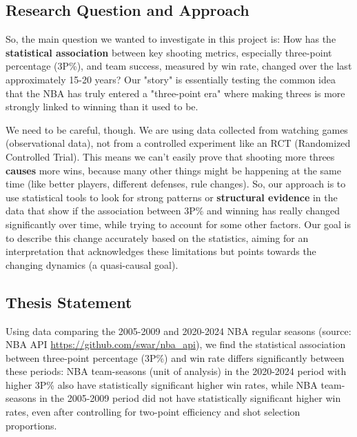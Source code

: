 \documentclass[11pt, a4paper]{article} %
\begin{document}
\subsection{Research Question and Approach} %

So, the main question we wanted to investigate in this project is: How has the \textbf{statistical association} between key shooting 
metrics, especially three-point percentage (3P\%), and team success, measured by win rate, changed over the last approximately 
15-20 years? Our "story" is essentially testing the common idea that the NBA has truly entered a "three-point era" where making 
threes is more strongly linked to winning than it used to be.

We need to be careful, though. We are using data collected from watching games (observational data), not from a controlled 
experiment like an RCT (Randomized Controlled Trial). This means we can't easily prove that shooting more threes \textbf{causes} more 
wins, because many other things might be happening at the same time (like better players, different defenses, rule changes). So, 
our approach is to use statistical tools to look for strong patterns or \textbf{structural evidence} in the data that show if the association between 3P\% and winning has really 
changed significantly over time, while trying to account for some other factors. Our goal is to describe this change accurately 
based on the statistics, aiming for an interpretation that acknowledges these limitations but points towards the changing dynamics 
(a quasi-causal goal).

\subsection{Thesis Statement} %
Using data comparing the 2005-2009 and 2020-2024 NBA regular seasons (source: NBA API \href{https://github.com/swar/nba_api}{https://github.com/swar/nba\_api}), we find the statistical association between 
three-point percentage (3P\%) and win rate differs significantly between these periods: NBA team-seasons (unit of analysis) in 
the 2020-2024 period with higher 3P\% also have statistically significant higher win rates, while NBA team-seasons in the 2005-2009 
period did not have statistically significant higher win rates, even after controlling for two-point efficiency and shot selection 
proportions.
\end{document}

